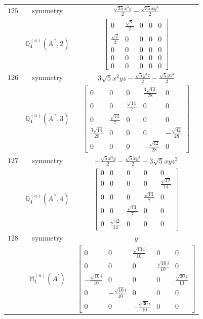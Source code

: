 \documentclass[fleqn,8pt,landscape]{jsarticle}
\begin{document}
\begin{longtable}{ccc}
$ 125 $ & $ \text{symmetry} $ & $ \frac{\sqrt{35} x^{3} y}{2} - \frac{\sqrt{35} x y^{3}}{2} $ \\
$  $ & $ \mathbb{Q}_{4}^{(a)}(A^{\prime\prime},2) $ & $ \begin{bmatrix} 0 & \frac{\sqrt{2}}{2} & 0 & 0 & 0 \\ \frac{\sqrt{2}}{2} & 0 & 0 & 0 & 0 \\ 0 & 0 & 0 & 0 & 0 \\ 0 & 0 & 0 & 0 & 0 \\ 0 & 0 & 0 & 0 & 0 \end{bmatrix} $ \\ \hline
$ 126 $ & $ \text{symmetry} $ & $ 3 \sqrt{5} x^{2} y z - \frac{\sqrt{5} y^{3} z}{2} - \frac{\sqrt{5} y z^{3}}{2} $ \\
$  $ & $ \mathbb{Q}_{4}^{(a)}(A^{\prime\prime},3) $ & $ \begin{bmatrix} 0 & 0 & 0 & \frac{3 \sqrt{14}}{28} & 0 \\ 0 & 0 & \frac{\sqrt{14}}{7} & 0 & 0 \\ 0 & \frac{\sqrt{14}}{7} & 0 & 0 & 0 \\ \frac{3 \sqrt{14}}{28} & 0 & 0 & 0 & - \frac{\sqrt{42}}{28} \\ 0 & 0 & 0 & - \frac{\sqrt{42}}{28} & 0 \end{bmatrix} $ \\ \hline
$ 127 $ & $ \text{symmetry} $ & $ - \frac{\sqrt{5} x^{3} y}{2} - \frac{\sqrt{5} x y^{3}}{2} + 3 \sqrt{5} x y z^{2} $ \\
$  $ & $ \mathbb{Q}_{4}^{(a)}(A^{\prime\prime},4) $ & $ \begin{bmatrix} 0 & 0 & 0 & 0 & 0 \\ 0 & 0 & 0 & 0 & \frac{\sqrt{42}}{14} \\ 0 & 0 & 0 & \frac{\sqrt{14}}{7} & 0 \\ 0 & 0 & \frac{\sqrt{14}}{7} & 0 & 0 \\ 0 & \frac{\sqrt{42}}{14} & 0 & 0 & 0 \end{bmatrix} $ \\ \hline
$ 128 $ & $ \text{symmetry} $ & $ y $ \\
$  $ & $ \mathbb{M}_{1}^{(a)}(A^{\prime}) $ & $ \begin{bmatrix} 0 & 0 & \frac{\sqrt{10} i}{10} & 0 & 0 \\ 0 & 0 & 0 & \frac{\sqrt{10} i}{10} & 0 \\ - \frac{\sqrt{10} i}{10} & 0 & 0 & 0 & \frac{\sqrt{30} i}{10} \\ 0 & - \frac{\sqrt{10} i}{10} & 0 & 0 & 0 \\ 0 & 0 & - \frac{\sqrt{30} i}{10} & 0 & 0 \end{bmatrix} $ \\ \hline

\end{longtable}
\end{document}
